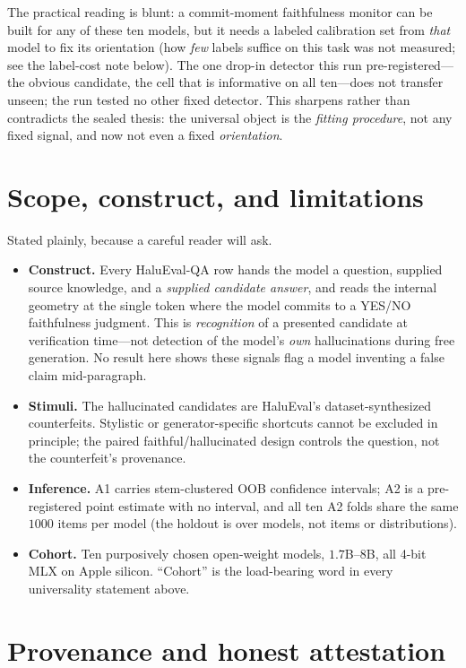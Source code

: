 \documentclass[11pt]{article}
\begin{document}
The practical reading is blunt: a commit-moment faithfulness monitor can be built for any of these
ten models, but it needs a labeled calibration set from \emph{that} model to fix its orientation
(how \emph{few} labels suffice on this task was not measured; see the label-cost note below). The
one drop-in detector this run pre-registered---the obvious candidate, the cell that is informative
on all ten---does not transfer unseen; the run tested no other fixed detector. This sharpens rather
than contradicts the sealed thesis: the universal object is the \emph{fitting procedure}, not any
fixed signal, and now not even a fixed \emph{orientation}.

\section{Scope, construct, and limitations}

Stated plainly, because a careful reader will ask.

\begin{itemize}
\item \textbf{Construct.} Every HaluEval-QA row hands the model a question, supplied source
knowledge, and a \emph{supplied candidate answer}, and reads the internal geometry at the single
token where the model commits to a YES/NO faithfulness judgment. This is \emph{recognition} of a
presented candidate at verification time---not detection of the model's \emph{own} hallucinations
during free generation. No result here shows these signals flag a model inventing a false claim
mid-paragraph.
\item \textbf{Stimuli.} The hallucinated candidates are HaluEval's dataset-synthesized
counterfeits. Stylistic or generator-specific shortcuts cannot be excluded in principle; the
paired faithful/hallucinated design controls the question, not the counterfeit's provenance.
\item \textbf{Inference.} A1 carries stem-clustered OOB confidence intervals; A2 is a
pre-registered point estimate with no interval, and all ten A2 folds share the same $1000$ items
per model (the holdout is over models, not items or distributions).
\item \textbf{Cohort.} Ten purposively chosen open-weight models, $1.7$B--$8$B, all 4-bit MLX on
Apple silicon. ``Cohort'' is the load-bearing word in every universality statement above.
\end{itemize}

\section{Provenance and honest attestation}
\end{document}
